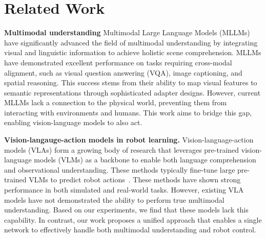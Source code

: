 \section{Related Work}

\textbf{Multimodal understanding}
Multimodal Large Language Models (MLLMs)~\cite{lu2024deepseek-vl, openflamingo, idefics, llava, llava1.5, wang2024qwen2, chen2024internvl, zhu2024comprehensive, ma2024janusflow, zhou2024transfusion, minigpt4, luo2024mono, chen2024internvl, blip-2, instructblip, chen2024expanding,karamcheti2024prismatic} have significantly advanced the field of multimodal understanding by integrating visual and linguistic information to achieve holistic scene comprehension. MLLMs have demonstrated excellent performance on tasks requiring cross-modal alignment, such as visual question answering (VQA), image captioning, and spatial reasoning. This success stems from their ability to map visual features to semantic representations through sophisticated adapter designs. However, current MLLMs lack a connection to the physical world, preventing them from interacting with environments and humans. This work aims to bridge this gap, enabling vision-language models to also act.

\textbf{Vision-langauge-action models in robot learning.} Vision-language-action models (VLAs) form a growing body of research that leverages pre-trained vision-language models (VLMs) as a backbone to enable both language comprehension and observational understanding. These methods typically fine-tune large pre-trained VLMs to predict robot actions~\cite{brohan2023rt-2, roboflamingo, leo3d, wen2024tinyvla, pertsch2025fast, [pi0, kim24openvla, diffusion-policy, zhu2024scalingdp, wang2024sparse-dp, prasad2024consistencypolicy, black2023training, black2023zero, dasari2024ingredients, lin2024datascalinglawsimitation, multimodal_diffusion_transformer, aloha_unleashed, uehara2024fine, uehara2024feedback,ding2024quar}. These methods have shown strong performance in both simulated and real-world tasks. However, existing VLA models have not demonstrated the ability to perform true multimodal understanding. Based on our experiments, we find that these models lack this capability. In contrast, our work proposes a unified approach that enables a single network to effectively handle both multimodal understanding and robot control.